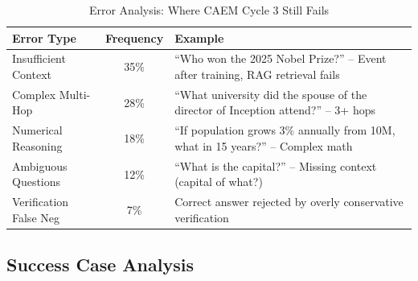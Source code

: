\documentclass[12pt,a4paper]{article}
\theoremstyle{definition}
\begin{document}
\begin{table}[htbp]
\centering
\caption{Error Analysis: Where CAEM Cycle 3 Still Fails}
\small
\begin{tabular}{lcp{6cm}}
\toprule
\textbf{Error Type} & \textbf{Frequency} & \textbf{Example} \\
\midrule
Insufficient Context & 35\% & ``Who won the 2025 Nobel Prize?'' -- Event after training, RAG retrieval fails \\
\midrule
Complex Multi-Hop & 28\% & ``What university did the spouse of the director of Inception attend?'' -- 3+ hops \\
\midrule
Numerical Reasoning & 18\% & ``If population grows 3\% annually from 10M, what in 15 years?'' -- Complex math \\
\midrule
Ambiguous Questions & 12\% & ``What is the capital?'' -- Missing context (capital of what?) \\
\midrule
Verification False Neg & 7\% & Correct answer rejected by overly conservative verification \\
\bottomrule
\end{tabular}
\end{table}

\subsection{Success Case Analysis}
\end{document}
